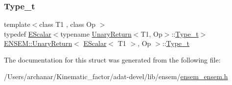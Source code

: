 \subsubsection{\texorpdfstring{Type\_t}{Type\_t}\hspace{0.1cm}{\footnotesize\ttfamily [3/3]}}
{\footnotesize\ttfamily template$<$class T1 , class Op $>$ \\
typedef \mbox{\hyperlink{classENSEM_1_1EScalar}{E\+Scalar}}$<$typename \mbox{\hyperlink{structENSEM_1_1UnaryReturn}{Unary\+Return}}$<$T1, Op$>$\+::\mbox{\hyperlink{structENSEM_1_1UnaryReturn_3_01EScalar_3_01T1_01_4_00_01Op_01_4_acb8455aafdd37d1ee54a8dd81669fe24}{Type\+\_\+t}}$>$ \mbox{\hyperlink{structENSEM_1_1UnaryReturn}{E\+N\+S\+E\+M\+::\+Unary\+Return}}$<$ \mbox{\hyperlink{classENSEM_1_1EScalar}{E\+Scalar}}$<$ T1 $>$, Op $>$\+::\mbox{\hyperlink{structENSEM_1_1UnaryReturn_3_01EScalar_3_01T1_01_4_00_01Op_01_4_acb8455aafdd37d1ee54a8dd81669fe24}{Type\+\_\+t}}}



The documentation for this struct was generated from the following file\+:\begin{DoxyCompactItemize}
\item 
/\+Users/archanar/\+Kinematic\+\_\+factor/adat-\/devel/lib/ensem/\mbox{\hyperlink{adat-devel_2lib_2ensem_2ensem__ensem_8h}{ensem\+\_\+ensem.\+h}}\end{DoxyCompactItemize}
